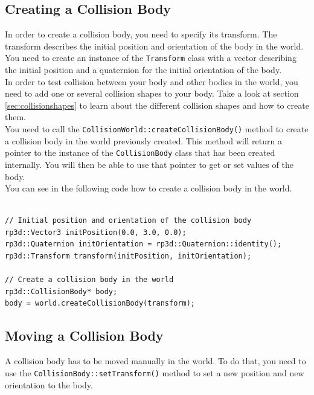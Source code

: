 \documentclass[a4paper,12pt]{article}
\begin{document}
    \subsection{Creating a Collision Body}

    In order to create a collision body, you need to specify its transform. The transform describes the initial
    position and orientation of the body in the world. You need to create an instance of the \texttt{Transform} class with a vector describing the
    initial position and a quaternion for the initial orientation of the body. \\

    In order to test collision between your body and other bodies in the world, you need to add one or several collision shapes to your body.
    Take a look at section \ref{sec:collisionshapes} to learn about the different collision shapes and how to create them. \\

    You need to call the \texttt{CollisionWorld::createCollisionBody()} method to create a collision body in the world previously created. This method will return a pointer to the instance
    of the \texttt{CollisionBody} class that has been created internally. You will then be able to use that pointer to get or set values of the body. \\

    You can see in the following code how to create a collision body in the world. \\

    \begin{lstlisting}

// Initial position and orientation of the collision body
rp3d::Vector3 initPosition(0.0, 3.0, 0.0);
rp3d::Quaternion initOrientation = rp3d::Quaternion::identity();
rp3d::Transform transform(initPosition, initOrientation);

// Create a collision body in the world
rp3d::CollisionBody* body;
body = world.createCollisionBody(transform);
  \end{lstlisting}

    \subsection{Moving a Collision Body}

    A collision body has to be moved manually in the world. To do that, you need to use the \texttt{CollisionBody::setTransform()} method to set a new position and new
   orientation to the body. \\
\end{document}
